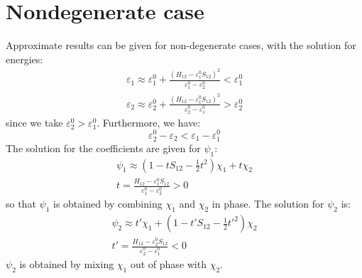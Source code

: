 \documentclass{article}
\begin{document}
\section{Nondegenerate case}
Approximate results can be given for non-degenerate cases, with the solution for energies:
\begin{align}
    \varepsilon_1 \approx \varepsilon_1^0 + \frac{(H_{12} - \varepsilon_1^0 S_{12})^2}{\varepsilon_1^0 - \varepsilon_2^0} < \varepsilon_1^0 \\
    \varepsilon_2 \approx \varepsilon_2^0 + \frac{(H_{12} - \varepsilon_1^0 S_{12})^2}{\varepsilon_2^0 - \varepsilon_1^0} > \varepsilon_2^0
\end{align}
since we take $\varepsilon_2^0 > \varepsilon_1^0$. Furthermore, we have:
\begin{equation}
    \varepsilon_2^0 - \varepsilon_2 < \varepsilon_1 - \varepsilon_1^0
\end{equation}
The solution for the coefficients are given for $\psi_1$:
\begin{gather}
    \psi_1 \approx \left(1 - tS_{12} - \frac{1}{2}t^2\right) \chi_1 + t \chi_2 \\
    t = \frac{H_{12}-\varepsilon_1^0S_{12}}{\varepsilon_1^0 - \varepsilon_2^0} > 0
\end{gather}
so that $\psi_1$ is obtained by combining $\chi_1$ and $\chi_2$ in phase. 
The solution for $\psi_2$ is:
\begin{gather}
    \psi_2 \approx t' \chi_1 + \left( 1 - t' S_{12} - \frac{1}{2}t'^2 \right) \chi_2 \\
    t' = \frac{H_{12}-\varepsilon_2^0S_{12}}{\varepsilon_2^0 - \varepsilon_1^0} < 0
\end{gather}
$\psi_2$ is obtained by mixing $\chi_1$ out of phase with $\chi_2$.
\end{document}
